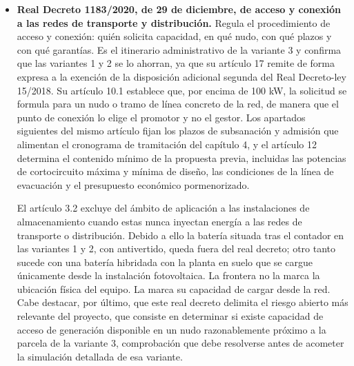 \begin{itemize}
    La aplicación del real decreto al proyecto se resume así. La instalación en cubierta se acoge a la figura de instalación próxima de red interior y a la modalidad sin excedentes. Las marquesinas del aparcamiento se levantan sobre una referencia catastral que difiere de la del edificio a partir del séptimo dígito, por lo que no pueden ampararse en el supuesto de identidad catastral y se resuelven mediante línea propia al amparo del primer supuesto. La planta en suelo, en cambio, se configura como instalación próxima a través de la red y, en consecuencia, en modalidad con excedentes y con permisos de acceso y conexión propios.

    \item \textbf{Real Decreto 1183/2020, de 29 de diciembre, de acceso y conexión a las redes de transporte y distribución.} Regula el procedimiento de acceso y conexión: quién solicita capacidad, en qué nudo, con qué plazos y con qué garantías. Es el itinerario administrativo de la variante 3 y confirma que las variantes 1 y 2 se lo ahorran, ya que su artículo 17 remite de forma expresa a la exención de la disposición adicional segunda del Real Decreto-ley 15/2018. Su artículo 10.1 establece que, por encima de 100 kW, la solicitud se formula para un nudo o tramo de línea concreto de la red, de manera que el punto de conexión lo elige el promotor y no el gestor. Los apartados siguientes del mismo artículo fijan los plazos de subsanación y admisión que alimentan el cronograma de tramitación del capítulo 4, y el artículo 12 determina el contenido mínimo de la propuesta previa, incluidas las potencias de cortocircuito máxima y mínima de diseño, las condiciones de la línea de evacuación y el presupuesto económico pormenorizado.

    El artículo 3.2 excluye del ámbito de aplicación a las instalaciones de almacenamiento cuando estas nunca inyectan energía a las redes de transporte o distribución. Debido a ello la batería situada tras el contador en las variantes 1 y 2, con antivertido, queda fuera del real decreto; otro tanto sucede con una batería hibridada con la planta en suelo que se cargue únicamente desde la instalación fotovoltaica. La frontera no la marca la ubicación física del equipo. La marca su capacidad de cargar desde la red. Cabe destacar, por último, que este real decreto delimita el riesgo abierto más relevante del proyecto, que consiste en determinar si existe capacidad de acceso de generación disponible en un nudo razonablemente próximo a la parcela de la variante 3, comprobación que debe resolverse antes de acometer la simulación detallada de esa variante.


\end{itemize}
